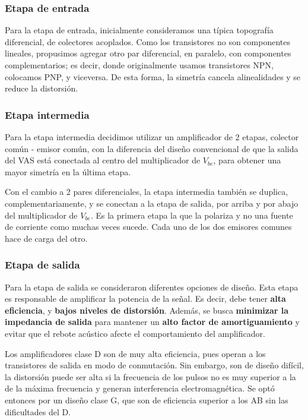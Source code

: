 \documentclass[a4paper,12pt,twoside]{article}
\begin{document}
\subsubsection{Etapa de entrada}
Para la etapa de entrada, inicialmente consideramos una típica topografía diferencial, de colectores acoplados. Como los transistores no son componentes lineales, propusimos agregar otro par diferencial, en paralelo, con componentes complementarios; es decir, donde originalmente usamos transistores NPN, colocamos PNP, y viceversa. De esta forma, la simetría cancela alinealidades y se reduce la distorsión. 

\subsubsection{Etapa intermedia}
Para la etapa intermedia decidimos utilizar un amplificador de 2 etapas, colector común - emisor común, con la diferencia del diseño convencional de que la salida del VAS está conectada al centro del multiplicador de $V_{be}$, para obtener una mayor simetría en la última etapa.

Con el cambio a 2 pares diferenciales, la etapa intermedia también se duplica, complementariamente, y se conectan a la etapa de salida, por arriba y por abajo del multiplicador de $V_{be}$. Es la primera etapa la que la polariza y no una fuente de corriente como muchas veces sucede. Cada uno de los dos emisores comunes hace de carga del otro.

\subsubsection{Etapa de salida}
Para la etapa de salida se consideraron diferentes opciones de diseño. Esta etapa es responsable de amplificar la potencia de la señal. Es decir, debe tener \textbf{alta eficiencia}, y \textbf{bajos niveles de distorsión}. Además, se busca \textbf{minimizar la impedancia de salida} para mantener un \textbf{alto factor de amortiguamiento} y evitar que el rebote acústico afecte el comportamiento del amplificador. 

Los amplificadores clase D son de muy alta eficiencia, pues operan a los transistores de salida en modo de conmutación. Sin embargo, son de diseño difícil, la distorsión puede ser alta si la frecuencia de los pulsos no es muy superior a la de la máxima frecuencia y generan interferencia electromagnética. Se optó entonces por un diseño clase G, que son de eficiencia superior a los AB sin las dificultades del D. 
\end{document}

